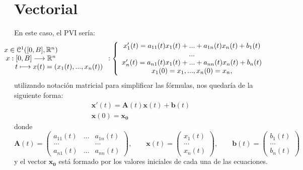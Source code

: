 \section{Vectorial}
En este caso, el PVI sería:
\begin{equation}\label{eq:vect}
 \hspace*{-3cm} 	\begin{array}{c} x \in \mathcal{C}^1([0,B],\R^n) \\ x:[0,B] \longrightarrow \R^n \\ \qquad \qquad \qquad \qquad t \longmapsto x(t) = (x_1(t),...,x_n(t)) \end{array}:\left\lbrace\begin{array}{c} x_1'(t) = a_{11}(t)x_1(t)+...+a_{1n}(t)x_n(t)+b_1(t) \\ ... \\ x_n'(t) = a_{n1}(t)x_1(t)+...+a_{nn}(t)x_n(t)+b_n(t) \\ x_1(0) = x_1,...,x_n(0) =x_n, \end{array}\right.
\end{equation}
utilizando notación matricial para simplificar las fórmulas, nos quedaría de la siguiente forma:
\begin{equation}
	\begin{array}{c}
		\textbf{x}'(t) = \textbf{A}(t)\textbf{x}(t)+\textbf{b}(t) \\ \textbf{x}(0) = \textbf{x}_\textbf{0}
	\end{array}
\end{equation}
donde
\begin{equation}
	\textbf{A}(t) = \begin{pmatrix}
		a_{11}(t) & ... & a_{1n}(t)\\ 
		... & & ... \\
		a_{n1}(t) & ... & a_{nn}(t)
	\end{pmatrix}, \qquad \textbf{x}(t) = \begin{pmatrix}
	x_1(t) \\ ... \\ x_n(t)
	\end{pmatrix}, \qquad \textbf{b}(t) = \begin{pmatrix}
	b_1(t) \\ ... \\ b_n(t)
	\end{pmatrix}
\end{equation}
y el vector $\textbf{x}_\textbf{0}$ está formado por los valores iniciales de cada una de las ecuaciones.

